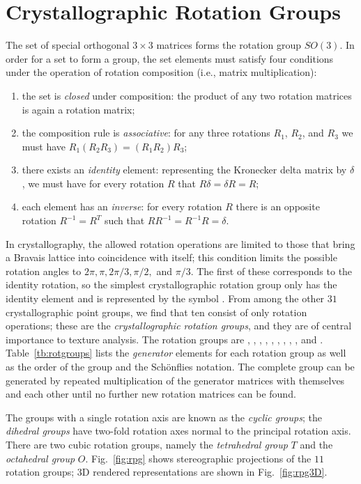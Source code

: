 \section{Crystallographic Rotation Groups}
The set of special orthogonal $3\times 3$ matrices forms the rotation group $SO(3)$.  In order for a set to form a group, the set elements must satisfy four conditions under the operation of rotation composition (i.e., matrix multiplication):
\begin{enumerate}
	\item the set is \textit{closed} under composition: the product of any two rotation matrices is again a rotation matrix;
	\item the composition rule is \textit{associative}: for any three rotations $R_1$, $R_2$, and $R_3$ we must have $R_1(R_2R_3)=(R_1R_2)R_3$;
	\item there exists an \textit{identity} element: representing the Kronecker delta matrix by $\delta$, we must have for every rotation $R$ that $R\delta=\delta R=R$;
	\item each element has an \textit{inverse}: for every rotation $R$ there is an opposite rotation $R^{-1}=R^T$ such that $RR^{-1}=R^{-1}R=\delta$.
\end{enumerate}
In crystallography, the allowed rotation operations are limited to those that bring a Bravais lattice into coincidence with itself; this condition limits the possible rotation angles to $2\pi, \pi, 2\pi/3, \pi/2,$ and $\pi/3$.  The first of these corresponds to the identity rotation, so the simplest crystallographic rotation group only has the identity element and is represented by the symbol .  From among the other $31$ crystallographic point groups, we find that ten consist of only rotation operations; these are the \textit{crystallographic rotation groups}, and they are of central importance to texture analysis.  The rotation groups are , , , , , , , , , and .  Table~\ref{tb:rotgroups} lists the \textit{generator} elements for each rotation group as well as the order of the group and the Sch\"onflies notation. The complete group can be generated by repeated multiplication of the generator matrices with themselves and each other until no further new rotation matrices can be found.

The groups with a single rotation axis are known as the \textit{cyclic groups}; the \textit{dihedral groups} have two-fold rotation axes normal to the principal rotation axis. There are two cubic rotation groups, namely the \textit{tetrahedral group} $T$ and the \textit{octahedral group} $O$.  Fig.~\ref{fig:rpg} shows stereographic projections of the $11$ rotation groups; 3D rendered representations are shown in Fig.~\ref{fig:rpg3D}.


